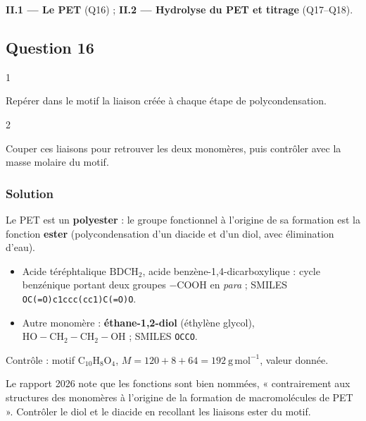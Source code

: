 \documentclass[11pt,a4paper]{article}
\providecommand{\tightlist}{\setlength{\itemsep}{0pt}\setlength{\parskip}{0pt}}
\begin{document}
\textbf{II.1 --- Le PET} (Q16) ; \textbf{II.2 --- Hydrolyse du PET et titrage} (Q17--Q18).

\hypertarget{question-16}{%
\subsection{Question 16}\label{question-16}}

\begin{indication}{1}

Repérer dans le motif la liaison créée à chaque étape de polycondensation.

\end{indication}

\begin{indication}{2}

Couper ces liaisons pour retrouver les deux monomères, puis contrôler avec la masse molaire du motif.

\end{indication}

\hypertarget{solution-15}{%
\subsubsection{Solution}\label{solution-15}}

Le PET est un \textbf{polyester} : le groupe fonctionnel à l'origine de sa formation est la fonction \textbf{ester} (polycondensation d'un diacide et d'un diol, avec élimination d'eau).

\begin{itemize}
\tightlist
\item
  Acide téréphtalique \(\mathrm{BDCH_2}\), acide benzène-\allowbreak{}1,4-\allowbreak{}dicarboxylique : cycle benzénique portant deux groupes \(-\mathrm{COOH}\) en \emph{para} ; SMILES \texttt{OC(\allowbreak{}=\allowbreak{}O)\allowbreak{}c1ccc(\allowbreak{}cc1)\allowbreak{}C(\allowbreak{}=\allowbreak{}O)\allowbreak{}O}.
\item
  Autre monomère : \textbf{éthane-1,2-diol} (éthylène glycol), \(\mathrm{HO{-}CH_2{-}CH_2{-}OH}\) ; SMILES \texttt{OCCO}.
\end{itemize}

Contrôle : motif \(\mathrm{C_{10}H_8O_4}\), \(M=120+8+64=192\ \mathrm{g\,mol^{-1}}\), valeur donnée.

\begin{piege}

Le rapport 2026 note que les fonctions sont bien nommées, « contrairement aux structures des monomères à l'origine de la formation de macromolécules de PET ». Contrôler le diol et le diacide en recollant les liaisons ester du motif.

\end{piege}
\end{document}
